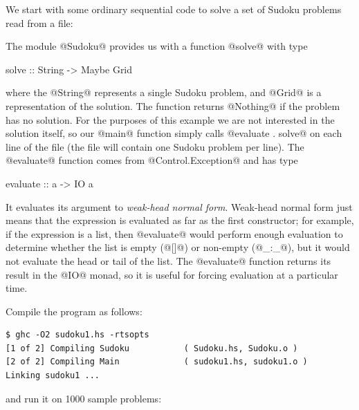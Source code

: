 We start with some ordinary sequential code to solve a set of Sudoku
problems read from a file:


The module @Sudoku@ provides us with a function @solve@ with type

\begin{haskell}
solve :: String -> Maybe Grid
\end{haskell}

\noindent where the @String@ represents a single Sudoku problem, and
@Grid@ is a representation of the solution.  The function returns
@Nothing@ if the problem has no solution.  For the purposes of this
example we are not interested in the solution itself, so our @main@
function simply calls @evaluate . solve@ on each line of the file (the
file will contain one Sudoku problem per line).  The @evaluate@
function comes from @Control.Exception@ and has type

\begin{haskell}
evaluate :: a -> IO a
\end{haskell}

\noindent It evaluates its argument to \emph{weak-head normal form}.
Weak-head normal form just means that the expression is evaluated as
far as the first constructor; for example, if the expression is a
list, then @evaluate@ would perform enough evaluation to determine
whether the list is empty (@[]@) or non-empty (@_:_@), but it would
not evaluate the head or tail of the list.  The @evaluate@ function
returns its result in the @IO@ monad, so it is useful for forcing
evaluation at a particular time.

Compile the program as follows:

{\small \begin{verbatim}
$ ghc -O2 sudoku1.hs -rtsopts
[1 of 2] Compiling Sudoku           ( Sudoku.hs, Sudoku.o )
[2 of 2] Compiling Main             ( sudoku1.hs, sudoku1.o )
Linking sudoku1 ...
\end{verbatim}}

\noindent and run it on 1000 sample problems:

